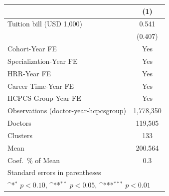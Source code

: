 {
\def\sym#1{\ifmmode^{#1}\else\(^{#1}\)\fi}
\begin{tabular}{l*{1}{c}}
\hline\hline
                    &\multicolumn{1}{c}{(1)}         \\
\hline
Tuition bill (USD 1,000)&       0.541         \\
                    &     (0.407)         \\
[1em]
Cohort-Year FE      &         Yes         \\
[1em]
Specialization-Year FE&         Yes         \\
[1em]
HRR-Year FE         &         Yes         \\
[1em]
Career Time-Year FE &         Yes         \\
[1em]
HCPCS Group-Year FE &         Yes         \\
\hline
Observations (doctor-year-hcpcsgroup)&   1,778,350         \\
Doctors             &     119,505         \\
Clusters            &         133         \\
Mean                &     200.564         \\
Coef.\ \% of Mean   &         0.3         \\
\hline\hline
\multicolumn{2}{l}{\footnotesize Standard errors in parentheses}\\
\multicolumn{2}{l}{\footnotesize \sym{*} \(p<0.10\), \sym{**} \(p<0.05\), \sym{***} \(p<0.01\)}\\
\end{tabular}
}
